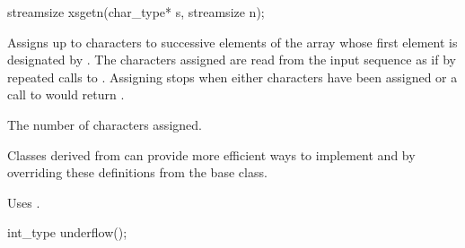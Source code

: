 %
\begin{itemdecl}
streamsize xsgetn(char_type* s, streamsize n);
\end{itemdecl}

\begin{itemdescr}
\pnum
\effects
Assigns up to  characters to successive elements of
the array whose first element is designated by .
The characters assigned are read from the input sequence as if
by repeated calls to
.
Assigning stops when either  characters
have been assigned or a call to
would return
.

\pnum
\returns
The number of characters assigned.
\begin{footnote}
Classes derived from
can provide more efficient ways to implement
and
by overriding these definitions from the base class.
\end{footnote}

\pnum
\remarks
Uses
.
\end{itemdescr}

%
\begin{itemdecl}
int_type underflow();
\end{itemdecl}

